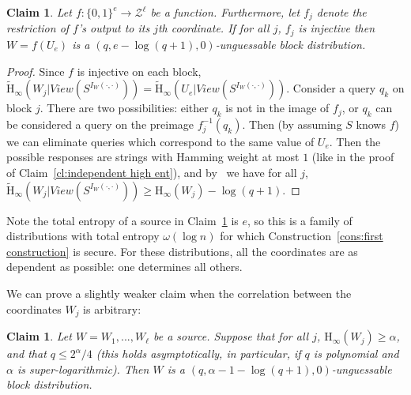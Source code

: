 \documentclass[11pt]{article}
\newcommand{\clref}[1]{\mbox{Claim~\ref{#1}}}
\newcommand{\consref}[1]{\mbox{Construction~\ref{#1}}}
\newcommand{\zo}{\ensuremath{\{0, 1\}}}
\newcommand{\Hoo}{\mathrm{H}_\infty}
\newcommand{\Hav}{\tilde{\mathrm{H}}_\infty}
\newtheorem{claim}[theorem]{Claim}
\begin{document}
\begin{claim}
\label{cl:each block from single seed}
Let $f:\zo^e \rightarrow \mathcal{Z}^\ell$ be a function.  Furthermore, let $f_j$ denote the restriction of $f$'s output to its $j$th coordinate.  If for all $j$, $f_j$ is injective then $W = f(U_e)$ is a $( q, e - \log (q+1), 0)$-unguessable block distribution.
\end{claim}
\begin{proof}
Since $f$ is injective on each block, $\Hav(W_j | View(S^{I_{W}(\cdot, \cdot)})) = \Hav(U_e | View(S^{I_{W}(\cdot, \cdot)}))$.  Consider a query $q_k$ on block $j$.  There are two possibilities: either $q_k$ is not in the image of $f_j$,  or $q_k$ can be considered a query on the preimage $f_j^{-1}(q_k)$. Then (by assuming $S$ knows $f$) we can eliminate queries which correspond to the same value of $U_e$.  Then the possible responses are strings with Hamming weight at most $1$ (like in the
proof of \clref{cl:independent high ent}),
 and by~\cite[Lemma 2.2]{DBLP:journals/siamcomp/DodisORS08} we have for all $j$, $\Hav(W_j | View(S^{I_{W}(\cdot, \cdot)})) \geq \Hoo(W_j) -\log (q+1)$.
\end{proof}

Note the total entropy of a source in \clref{cl:each block from single seed} is $e$, so this is a family of distributions with total entropy $\omega(\log n)$ for which \consref{cons:first construction} is secure.  For these distributions, all the coordinates are as dependent as possible: one determines all others.

We can prove a slightly weaker claim when the correlation between the coordinates $W_j$ is arbitrary:

\begin{claim}
\label{cl:all blocks entropy}
Let $W = W_1,..., W_\ell$ be a source.  Suppose that for all $j$, $\Hoo(W_j)\geq \alpha$, and that $q \le 2^{\alpha}/4$ (this holds asymptotically, in particular, if $q$ is polynomial and $\alpha$ is super-logarithmic). Then  $W$ is a $(q, \alpha-1-\log(q+1), 0)$-unguessable block distribution.
\end{claim}
\end{document}
